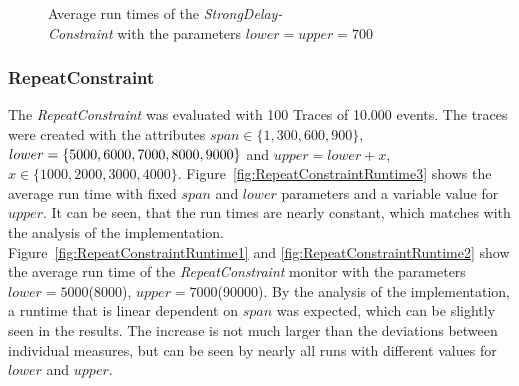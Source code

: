 \begin{figure}
\begin{minipage}{0.45\textwidth}
		\centering
		\caption{Average run times of the \textit{StrongDelay-\\Constraint} with the parameters $lower = upper = 700$}
		\label{fig:runtimeStrongDelay2}
	\end{minipage}
\end{figure}




\subsubsection{RepeatConstraint}
	\label{sec_runtimeRepeat}
	The \textit{RepeatConstraint} was evaluated with 100 Traces of 10.000 events. The traces were created with the attributes $span\in\{1,300,600,900\}$, $lower=\{5000,6000,7000,\\8000,9000\}$ and $upper=lower+x$, $x\in\{1000,2000,3000,4000\}$.  Figure~\ref{fig:RepeatConstraintRuntime3} shows the average run time with fixed $span$ and $lower$ parameters and a variable value for $upper$. It can be seen, that the run times are nearly constant, which matches with the analysis of the implementation.\\ Figure~\ref{fig:RepeatConstraintRuntime1} and \ref{fig:RepeatConstraintRuntime2} show the average run time of the \textit{RepeatConstraint} monitor with the parameters $lower=5000$(8000), $upper=7000$(90000). By the analysis of the implementation, a runtime that is linear dependent on $span$ was expected, which can be slightly seen in the results. The increase is not much larger than the deviations between individual measures, but can be seen by nearly all runs with different values for $lower$ and $upper$. 

